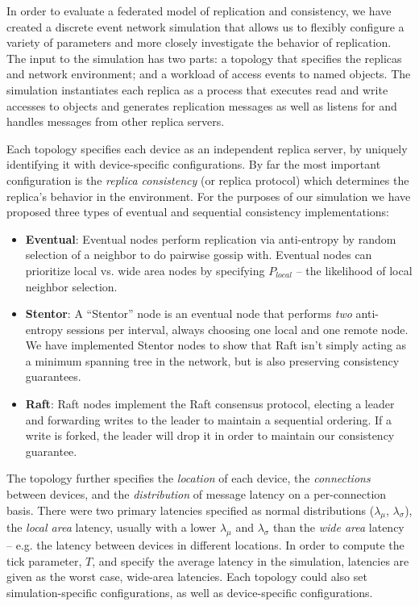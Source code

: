 \documentclass[10pt,conference,letterpaper]{IEEEtran}
\begin{document}
In order to evaluate a federated model of replication and consistency, we have created a discrete event network simulation that allows us to flexibly configure a variety of parameters and more closely investigate the behavior of replication. The input to the simulation has two parts: a topology that specifies the replicas and network environment; and a workload of access events to named objects. The simulation instantiates each replica as a process that executes read and write accesses to objects and generates replication messages as well as listens for and handles messages from other replica servers.

Each topology specifies each device as an independent replica server, by uniquely identifying it with device-specific configurations. By far the most important configuration is the \textit{replica consistency} (or replica protocol) which determines the replica's behavior in the environment. For the purposes of our simulation we have proposed three types of eventual and sequential consistency implementations:

\begin{itemize}
    \item \textbf{Eventual}: Eventual nodes perform replication via anti-entropy by random selection of a neighbor to do pairwise gossip with. Eventual nodes can prioritize local vs. wide area nodes by specifying $P_{local}$ -- the likelihood of local neighbor selection.
    \item \textbf{Stentor}: A ``Stentor'' node is an eventual node that performs \textit{two} anti-entropy sessions per interval, always choosing one local and one remote node. We have implemented Stentor nodes to show that Raft isn't simply acting as a minimum spanning tree in the network, but is also preserving consistency guarantees.
    \item \textbf{Raft}: Raft nodes implement the Raft consensus protocol, electing a leader and forwarding writes to the leader to maintain a sequential ordering. If a write is forked, the leader will drop it in order to maintain our consistency guarantee.
\end{itemize}

The topology further specifies the \textit{location} of each device, the \textit{connections} between devices, and the \textit{distribution} of message latency on a per-connection basis. There were two primary latencies specified as normal distributions ($\lambda_{\mu}$, $\lambda_{\sigma}$), the \textit{local area} latency, usually with a lower $\lambda_{\mu}$ and $\lambda_{\sigma}$ than the \textit{wide area} latency -- e.g. the latency between devices in different locations. In order to compute the tick parameter, $T$, and specify the average latency in the simulation, latencies are given as the worst case, wide-area latencies. Each topology could also set simulation-specific configurations, as well as device-specific configurations.
\end{document}
